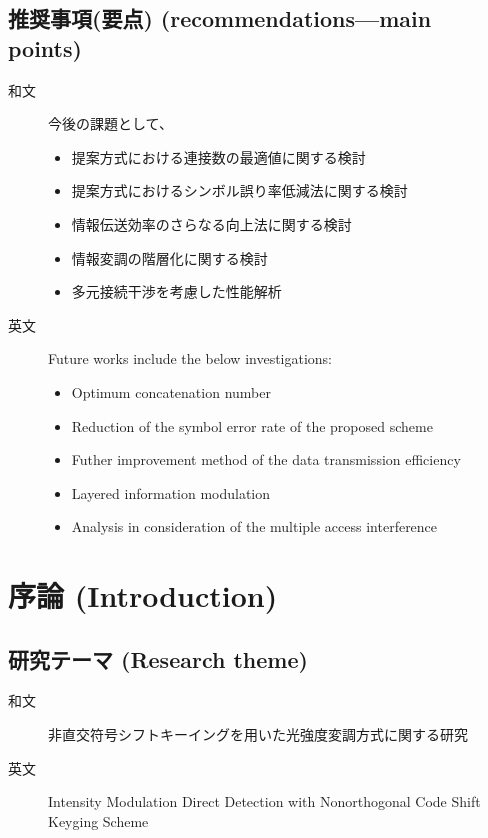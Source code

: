 ﻿\documentclass[a4j,10pt]{jarticle}
\begin{document}
\subsection{推奨事項(要点) (recommendations---main points)}\label{recommendations}
\begin{description}
 \item[和文] 今後の課題として、
\begin{itemize}
 \item 提案方式における連接数の最適値に関する検討
 \item 提案方式におけるシンボル誤り率低減法に関する検討
 \item 情報伝送効率のさらなる向上法に関する検討
 \item 情報変調の階層化に関する検討
 \item 多元接続干渉を考慮した性能解析
\end{itemize}
%
 \item[英文] Future works include the below investigations:
 \begin{itemize}
  \item Optimum concatenation number 
  \item Reduction of the symbol error rate of the proposed scheme 
  \item Futher improvement method of the data transmission efficiency 
  \item Layered information modulation 
  \item Analysis in consideration of the multiple access interference
 \end{itemize}
\end{description}
%
\section{序論 (Introduction)}
\subsection{研究テーマ (Research theme)}
\begin{description}
 \item[和文] 非直交符号シフトキーイングを用いた光強度変調方式に関する研究
 \item[英文] Intensity Modulation Direct Detection with Nonorthogonal Code Shift Keyging Scheme
\end{description}
%
\end{document}
